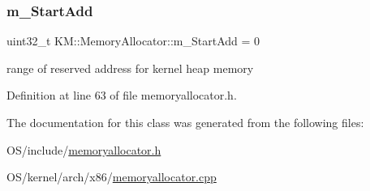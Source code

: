 \subsubsection{\texorpdfstring{m\+\_\+\+Start\+Add}{m\_StartAdd}}
{\footnotesize\ttfamily uint32\+\_\+t K\+M\+::\+Memory\+Allocator\+::m\+\_\+\+Start\+Add = 0}



range of reserved address for kernel heap memory 



Definition at line 63 of file memoryallocator.\+h.



The documentation for this class was generated from the following files\+:\begin{DoxyCompactItemize}
\item 
O\+S/include/\hyperlink{memoryallocator_8h}{memoryallocator.\+h}\item 
O\+S/kernel/arch/x86/\hyperlink{memoryallocator_8cpp}{memoryallocator.\+cpp}\end{DoxyCompactItemize}
